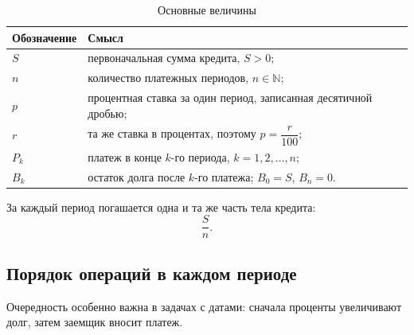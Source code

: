 \documentclass[a4paper,12pt]{article}
\begin{document}
\begin{table}[ht]
\centering
\caption{Основные величины}
\begin{tabularx}{\linewidth}{@{}lX@{}}
\toprule
Обозначение & Смысл \\
\midrule
$S$ & первоначальная сумма кредита, $S>0$; \\
$n$ & количество платежных периодов, $n\in\mathbb{N}$; \\
$p$ & процентная ставка за один период, записанная десятичной дробью; \\
$r$ & та же ставка в процентах, поэтому
      $p=\dfrac{r}{100}$; \\
$P_k$ & платеж в конце $k$-го периода,
        $k=1,2,\ldots,n$; \\
$B_k$ & остаток долга после $k$-го платежа;
        $B_0=S$, $B_n=0$. \\
\bottomrule
\end{tabularx}
\end{table}

За каждый период погашается одна и та же часть тела кредита:
\[
\boxed{\frac{S}{n}}.
\]

\subsection{Порядок операций в каждом периоде}

\begin{center}
\end{center}

Очередность особенно важна в задачах с датами: сначала проценты
увеличивают долг, затем заемщик вносит платеж.
\end{document}
